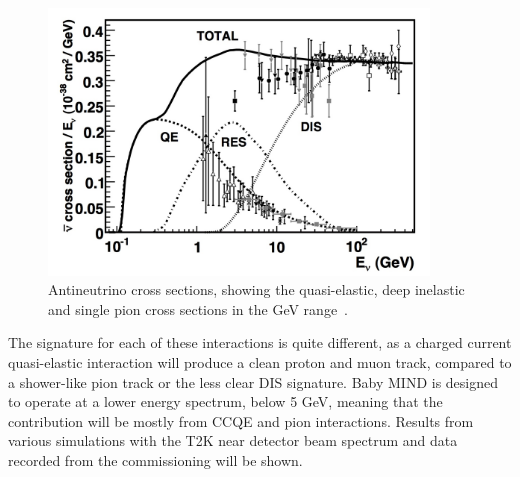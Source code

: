 \begin{figure}[h!]
\centering
\includegraphics[width=0.9\textwidth]{figures/antineutrinototal.jpeg}
\caption{Antineutrino cross sections, showing the quasi-elastic, deep inelastic and single pion cross sections in the GeV range~\cite{109Formaggio}.}
\label{fig:antineutrinoInteractionsFig}
\end{figure}

The signature for each of these interactions is quite different, as a charged current quasi-elastic interaction will produce a clean proton and muon track, compared to a shower-like pion track or the less clear DIS signature. Baby MIND is designed to operate at a lower energy spectrum, below 5 GeV, meaning that the contribution will be mostly from CCQE and pion interactions. Results from various simulations with the T2K near detector beam spectrum and data recorded from the commissioning will be shown.


